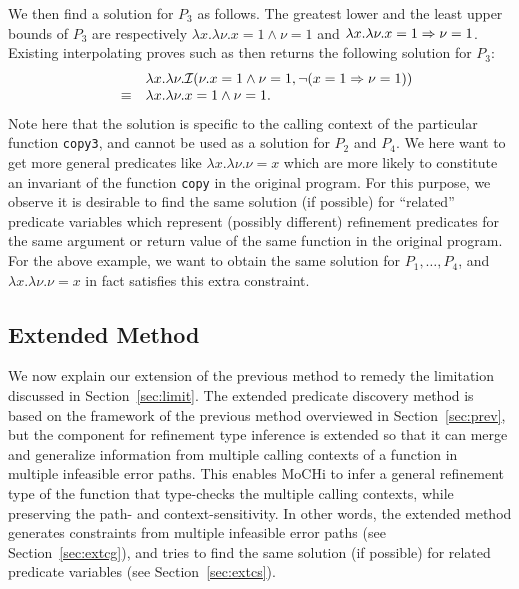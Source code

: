We then find a solution for \(P_3\) as follows.  The greatest lower and
the least upper bounds of \(P_3\) are respectively \(\lambda x.\lambda
\nu.x=1 \land \nu=1\) and \(\lambda x.\lambda \nu.x=1 \Rightarrow \nu=1\).
%
Existing interpolating proves such as \cite{Beyer2008} then returns the
following solution for \(P_3\):
\[
\begin{array}{rcl}
&&\lambda x.\lambda \nu.\mathcal{I}(\nu.x=1 \land \nu=1,\neg (x=1 \Rightarrow \nu=1)) \\
&\equiv& \lambda x.\lambda \nu.x=1 \land \nu=1.
\end{array}
\]
Note here that the solution is specific to the calling context of the
particular function \texttt{copy3}, and cannot be used as a solution for
\(P_2\) and \(P_4\).  We here want to get more general predicates like
\(\lambda x.\lambda \nu.\nu=x\) which are more likely to constitute an invariant
of the function \texttt{copy} in the original program.  For this purpose,
we observe it is desirable to find the same solution (if possible) for
``related'' predicate variables which represent (possibly different)
refinement predicates for the same argument or return value of the same
function in the original program.  For the above example, we want to
obtain the same solution for \(P_1,\dots,P_4\), and \(\lambda
x.\lambda \nu.\nu=x\) in fact satisfies this extra constraint.

\vspace{-2pt}
\subsection{Extended Method}
\label{sec:ext}

We now explain our extension of the previous method to remedy the
limitation discussed in Section~\ref{sec:limit}.  The extended predicate
discovery method is based on the framework of the previous method
overviewed in Section~\ref{sec:prev}, but the component for refinement
type inference is extended so that it can merge and generalize
information from multiple calling contexts of a function in multiple
infeasible error paths.  This enables MoCHi to infer a general
refinement type of the function that type-checks the multiple calling
contexts, while preserving the path- and context-sensitivity.  In other
words, the extended method generates constraints from multiple
infeasible error paths (see Section~\ref{sec:extcg}), and tries to find
the same solution (if possible) for related predicate variables (see
Section~\ref{sec:extcs}).

